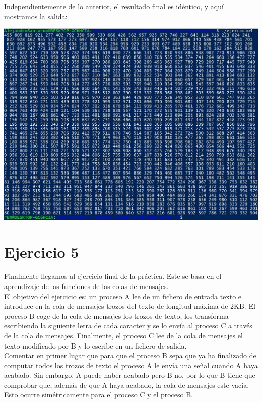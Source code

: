 \documentclass[12pt]{article}
\begin{document}
Independientemente de lo anterior, el resultado final es idéntico, y aquí mostramos la salida:
\begin{center}
	\includegraphics[scale=0.85]{ej4.JPG}
\end{center}


\section{Ejercicio 5}
Finalmente llegamos al ejercicio final de la práctica. Este se basa en el aprendizaje de las funciones de las colas de mensajes.\\

El objetivo del ejercicio es: un proceso A lee de un fichero de entrada texto e introduce en la cola de mensajes trozos del texto de longitud máxima de 2KB. El proceso B coge de la cola de mensajes los trozos de texto, los transforma escribiendo la siguiente letra de cada caracter y se lo envía al proceso C a través de la cola de mensajes. Finalmente, el proceso C lee de la cola de mensajes el texto modificado por B y lo escribe en un fichero de salida.\\

Comentar en primer lugar que para que el proceso B sepa que ya ha finalizado de computar todos los trozos de texto el proceso A le envía una señal cuando A haya acabado. Sin embargo, A puede haber acabado pero B no, por lo que B tiene que comprobar que, además de que A haya acabado, la cola de mensajes este vacía. Esto ocurre simétricamente para el proceso C y el proceso B.\\
\end{document}

